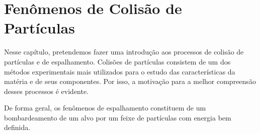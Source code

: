\chapter{Fenômenos de Colisão de Partículas}
Nesse capítulo, pretendemos fazer uma introdução aos processos de colisão de
partículas e de espalhamento. Colisões de partículas consistem de um dos
métodos experimentais mais utilizados para o estudo das características da
matéria e de seus componentes. Por isso, a motivação para a melhor compreensão
desses processos é evidente.

De forma geral, os fenômenos de espalhamento constituem de um bombardeamento de
um alvo por um feixe de partículas com energia bem definida. 

